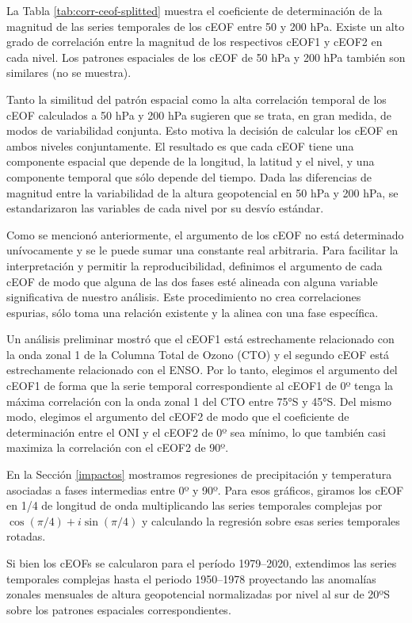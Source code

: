 \documentclass[12pt,oneside,a4paper]{reedthesis}
\begin{document}
La Tabla \ref{tab:corr-ceof-splitted} muestra el coeficiente de determinación de la magnitud de las series temporales de los cEOF entre 50 y 200 hPa.
Existe un alto grado de correlación entre la magnitud de los respectivos cEOF1 y cEOF2 en cada nivel.
Los patrones espaciales de los cEOF de 50 hPa y 200 hPa también son similares (no se muestra).

Tanto la similitud del patrón espacial como la alta correlación temporal de los cEOF calculados a 50 hPa y 200 hPa sugieren que se trata, en gran medida, de modos de variabilidad conjunta.
Esto motiva la decisión de calcular los cEOF en ambos niveles conjuntamente.
El resultado es que cada cEOF tiene una componente espacial que depende de la longitud, la latitud y el nivel, y una componente temporal que sólo depende del tiempo.
Dada las diferencias de magnitud entre la variabilidad de la altura geopotencial en 50 hPa y 200 hPa, se estandarizaron las variables de cada nivel por su desvío estándar.

Como se mencionó anteriormente, el argumento de los cEOF no está determinado unívocamente y se le puede sumar una constante real arbitraria.
Para facilitar la interpretación y permitir la reproducibilidad, definimos el argumento de cada cEOF de modo que alguna de las dos fases esté alineada con alguna variable significativa de nuestro análisis.
Este procedimiento no crea correlaciones espurias, sólo toma una relación existente y la alinea con una fase específica.

Un análisis preliminar mostró que el cEOF1 está estrechamente relacionado con la onda zonal 1 de la Columna Total de Ozono (CTO) y el segundo cEOF está estrechamente relacionado con el ENSO.
Por lo tanto, elegimos el argumento del cEOF1 de forma que la serie temporal correspondiente al cEOF1 de 0º tenga la máxima correlación con la onda zonal 1 del CTO entre 75°S y 45°S.
Del mismo modo, elegimos el argumento del cEOF2 de modo que el coeficiente de determinación entre el ONI y el cEOF2 de 0º sea mínimo, lo que también casi maximiza la correlación con el cEOF2 de 90º.

En la Sección \ref{impactos} mostramos regresiones de precipitación y temperatura asociadas a fases intermedias entre 0º y 90º.
Para esos gráficos, giramos los cEOF en 1/4 de longitud de onda multiplicando las series temporales complejas por \(\cos(\pi/4) + i\sin(\pi/4)\) y calculando la regresión sobre esas series temporales rotadas.

Si bien los cEOFs se calcularon para el período 1979--2020, extendimos las series temporales complejas hasta el periodo 1950--1978 proyectando las anomalías zonales mensuales de altura geopotencial normalizadas por nivel al sur de 20ºS sobre los patrones espaciales correspondientes.
\end{document}
